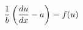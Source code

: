 \documentclass[preview]{standalone}
\begin{document}
\begin{align*}
\special{dvisvgm:raw <g id='unique000'>}\frac{1}{b}\left( \frac{du}{dx} - a \right) = f(u)\special{dvisvgm:raw </g>}
\end{align*}
\end{document}
